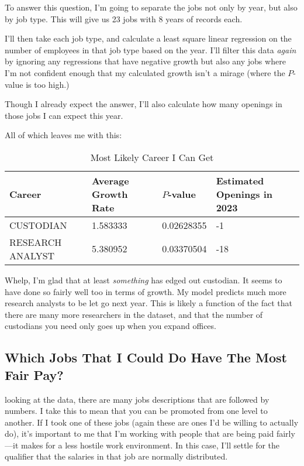 \documentclass[letterpaper]{article}
\theoremstyle{definition}
\begin{document}
To answer this question, I'm going to separate the jobs not only by year, but also by
job type. This will give us 23 jobs with 8 years of records each.

I'll then take each job type, and calculate a least square linear regression on the number
of employees in that job type based on the year.  I'll filter this data \emph{again} by
ignoring any regressions that have negative growth but also any jobs where I'm not
confident enough that my calculated growth isn't a mirage (where the $P$-value is too
high.)

Though I already expect the answer, I'll also calculate how many openings in those
jobs I can expect this year.

All of which leaves me with this:

\begin{table}[htpb]
	\centering
	\caption{Most Likely Career I Can Get}
	\label{tab:label}
	\begin{tabular}{l|lll}
	  Career  & Average Growth Rate & $P$-value & Estimated Openings in 2023\\
	\hline
		CUSTODIAN         & 1.583333 & 0.02628355&  -1\\
		RESEARCH ANALYST  & 5.380952 & 0.03370504& -18\\
	
	\end{tabular}
\end{table}

Whelp, I'm glad that at least \emph{something} has edged out custodian. It seems to have
done so fairly well too in terms of growth. My model predicts much more research analysts
to be let go next year. This is likely a function of the fact that there are many more
researchers in the dataset, and that the number of custodians you need only goes up when
you expand offices.

\hypertarget{which-jobs-that-i-could-do-have-the-most-fair-pay}{%
\subsection{Which Jobs That I Could Do Have The Most Fair
Pay?}\label{which-jobs-that-i-could-do-have-the-most-fair-pay}}

looking at the data, there are many jobs descriptions that are followed
by numbers. I take this to mean that you can be promoted from one level
to another. If I took one of these jobs (again these are ones I'd be willing to actually do),
it's important to me that I'm working with people that are being paid
fairly---it makes for a less hostile work environment. In this case,
I'll settle for the qualifier that the salaries in that job are normally
distributed.
\end{document}
